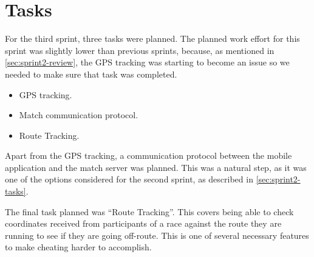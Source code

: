 \section{Tasks}
\label{sec:sprint3-tasks}

For the third sprint, three tasks were planned. The planned work effort for this sprint was slightly lower than previous sprints, because, as mentioned in \autoref{sec:sprint2-review}, the \ac{GPS} tracking was starting to become an issue so we needed to make sure that task was completed.

\begin{itemize}
	\item{\ac{GPS} tracking.}
	\item{Match communication protocol.}
	\item{Route Tracking.}
\end{itemize}

Apart from the \ac{GPS} tracking, a communication protocol between the mobile application and the match server was planned. This was a natural step, as it was one of the options considered for the second sprint, as described in \autoref{sec:sprint2-tasks}.

The final task planned was ``Route Tracking''. This covers being able to check coordinates received from participants of a race against the route they are running to see if they are going off-route. This is one of several necessary features to make cheating harder to accomplish.
